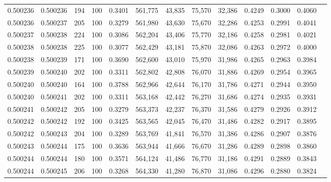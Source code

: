 \begin{tabular}{rrrrrrrrrrrrr}
0.500236 & 0.500236 &   194 & 100 &                                     0.3401 & 561,775 &  43,835 &  75,570 &  32,386 & 0.4249 & 0.3000 & 0.4060 \\
0.500236 & 0.500237 &   205 & 100 &                                     0.3279 & 561,980 &  43,630 &  75,670 &  32,286 & 0.4253 & 0.2991 & 0.4041 \\
0.500237 & 0.500238 &   224 & 100 &                                     0.3086 & 562,204 &  43,406 &  75,770 &  32,186 & 0.4258 & 0.2981 & 0.4021 \\
0.500238 & 0.500238 &   225 & 100 &                                     0.3077 & 562,429 &  43,181 &  75,870 &  32,086 & 0.4263 & 0.2972 & 0.4000 \\
0.500238 & 0.500239 &   171 & 100 &                                     0.3690 & 562,600 &  43,010 &  75,970 &  31,986 & 0.4265 & 0.2963 & 0.3984 \\
0.500239 & 0.500240 &   202 & 100 &                                     0.3311 & 562,802 &  42,808 &  76,070 &  31,886 & 0.4269 & 0.2954 & 0.3965 \\
0.500240 & 0.500240 &   164 & 100 &                                     0.3788 & 562,966 &  42,644 &  76,170 &  31,786 & 0.4271 & 0.2944 & 0.3950 \\
0.500240 & 0.500241 &   202 & 100 &                                     0.3311 & 563,168 &  42,442 &  76,270 &  31,686 & 0.4274 & 0.2935 & 0.3931 \\
0.500241 & 0.500242 &   205 & 100 &                                     0.3279 & 563,373 &  42,237 &  76,370 &  31,586 & 0.4279 & 0.2926 & 0.3912 \\
0.500242 & 0.500242 &   192 & 100 &                                     0.3425 & 563,565 &  42,045 &  76,470 &  31,486 & 0.4282 & 0.2917 & 0.3895 \\
0.500242 & 0.500243 &   204 & 100 &                                     0.3289 & 563,769 &  41,841 &  76,570 &  31,386 & 0.4286 & 0.2907 & 0.3876 \\
0.500243 & 0.500244 &   175 & 100 &                                     0.3636 & 563,944 &  41,666 &  76,670 &  31,286 & 0.4289 & 0.2898 & 0.3860 \\
0.500244 & 0.500244 &   180 & 100 &                                     0.3571 & 564,124 &  41,486 &  76,770 &  31,186 & 0.4291 & 0.2889 & 0.3843 \\
0.500244 & 0.500245 &   206 & 100 &                                     0.3268 & 564,330 &  41,280 &  76,870 &  31,086 & 0.4296 & 0.2880 & 0.3824 \\

\end{tabular}
